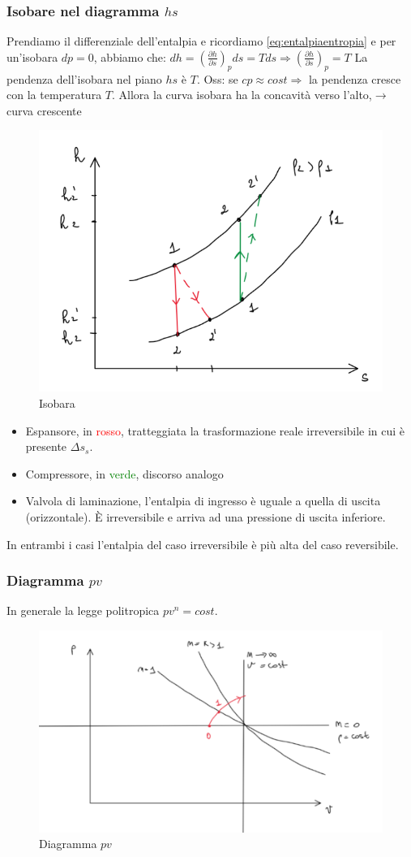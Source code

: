 \documentclass[a4paper]{article}
\numberwithin{equation}{section}%
\begin{document}
\subsubsection{Isobare nel diagramma $hs$}

Prendiamo il differenziale dell'entalpia e ricordiamo  \eqref{eq:entalpiaentropia} e per un'isobara $dp=0$, abbiamo che: $d h=\left(\frac{\partial h}{\partial s}\right)_{p} d s=T d s \Rightarrow\left(\frac{\partial h}{\partial s}\right)_{p}=T$ 
La pendenza dell'isobara nel piano $hs$ è $T$.
Oss: se $cp\approx cost \Longrightarrow$ la pendenza cresce con la temperatura $T$.  Allora la curva isobara ha la concavità verso l’alto,$\rightarrow$ curva crescente


\begin{figure}[H]
	\begin{center}
		\includegraphics[width=0.4\columnwidth]{isobara_hs.png}
		\caption{Isobara}
	\end{center}
\end{figure}

\begin{itemize}
	\item Espansore, in \textcolor{red}{rosso}, tratteggiata la trasformazione reale irreversibile in cui è presente $\Delta s_s$. 
	\item Compressore, in \textcolor{green}{verde}, discorso analogo
	\item Valvola di laminazione, l'entalpia di ingresso è uguale a quella di uscita (orizzontale). È irreversibile e arriva ad una pressione di uscita inferiore. 
\end{itemize}
In entrambi i casi l'entalpia del caso irreversibile è più alta del caso reversibile. 

\subsubsection{Diagramma $pv$}

In generale la legge politropica $pv^n=cost$.

\begin{figure}[H]
	\begin{center}
		\includegraphics[width=0.4\columnwidth]{diagpv.png}
		\caption{Diagramma $pv$}
	\end{center}
\end{figure}
\end{document}
